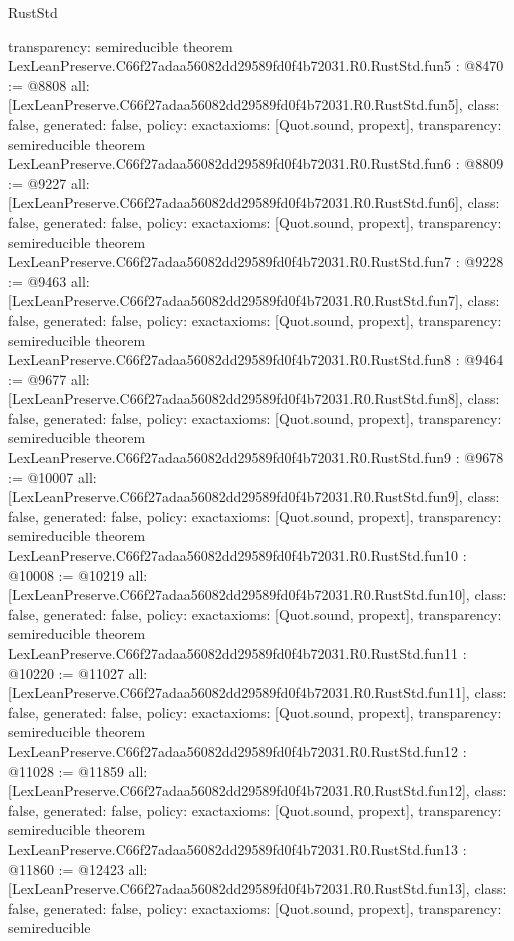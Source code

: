 \begin{lexlean}{RustStd}
\begin{coremodule}
{  transparency: semireducible
}
theorem LexLeanPreserve.C66f27adaa56082dd29589fd0f4b72031.R0.RustStd.fun5 : @8470 := @8808 {
  all: [LexLeanPreserve.C66f27adaa56082dd29589fd0f4b72031.R0.RustStd.fun5],
  class: false,
  generated: false,
  policy: exact{axioms: [Quot.sound, propext]},
  transparency: semireducible
}
theorem LexLeanPreserve.C66f27adaa56082dd29589fd0f4b72031.R0.RustStd.fun6 : @8809 := @9227 {
  all: [LexLeanPreserve.C66f27adaa56082dd29589fd0f4b72031.R0.RustStd.fun6],
  class: false,
  generated: false,
  policy: exact{axioms: [Quot.sound, propext]},
  transparency: semireducible
}
theorem LexLeanPreserve.C66f27adaa56082dd29589fd0f4b72031.R0.RustStd.fun7 : @9228 := @9463 {
  all: [LexLeanPreserve.C66f27adaa56082dd29589fd0f4b72031.R0.RustStd.fun7],
  class: false,
  generated: false,
  policy: exact{axioms: [Quot.sound, propext]},
  transparency: semireducible
}
theorem LexLeanPreserve.C66f27adaa56082dd29589fd0f4b72031.R0.RustStd.fun8 : @9464 := @9677 {
  all: [LexLeanPreserve.C66f27adaa56082dd29589fd0f4b72031.R0.RustStd.fun8],
  class: false,
  generated: false,
  policy: exact{axioms: [Quot.sound, propext]},
  transparency: semireducible
}
theorem LexLeanPreserve.C66f27adaa56082dd29589fd0f4b72031.R0.RustStd.fun9 : @9678 := @10007 {
  all: [LexLeanPreserve.C66f27adaa56082dd29589fd0f4b72031.R0.RustStd.fun9],
  class: false,
  generated: false,
  policy: exact{axioms: [Quot.sound, propext]},
  transparency: semireducible
}
theorem LexLeanPreserve.C66f27adaa56082dd29589fd0f4b72031.R0.RustStd.fun10 : @10008 := @10219 {
  all: [LexLeanPreserve.C66f27adaa56082dd29589fd0f4b72031.R0.RustStd.fun10],
  class: false,
  generated: false,
  policy: exact{axioms: [Quot.sound, propext]},
  transparency: semireducible
}
theorem LexLeanPreserve.C66f27adaa56082dd29589fd0f4b72031.R0.RustStd.fun11 : @10220 := @11027 {
  all: [LexLeanPreserve.C66f27adaa56082dd29589fd0f4b72031.R0.RustStd.fun11],
  class: false,
  generated: false,
  policy: exact{axioms: [Quot.sound, propext]},
  transparency: semireducible
}
theorem LexLeanPreserve.C66f27adaa56082dd29589fd0f4b72031.R0.RustStd.fun12 : @11028 := @11859 {
  all: [LexLeanPreserve.C66f27adaa56082dd29589fd0f4b72031.R0.RustStd.fun12],
  class: false,
  generated: false,
  policy: exact{axioms: [Quot.sound, propext]},
  transparency: semireducible
}
theorem LexLeanPreserve.C66f27adaa56082dd29589fd0f4b72031.R0.RustStd.fun13 : @11860 := @12423 {
  all: [LexLeanPreserve.C66f27adaa56082dd29589fd0f4b72031.R0.RustStd.fun13],
  class: false,
  generated: false,
  policy: exact{axioms: [Quot.sound, propext]},
  transparency: semireducible
}
\end{coremodule}
\end{lexlean}
